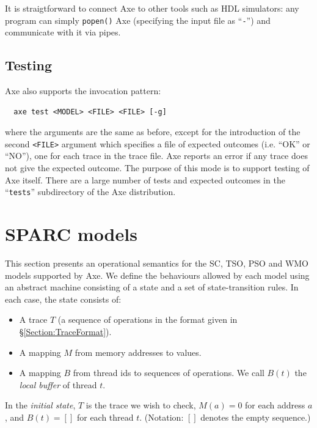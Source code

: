 \documentclass[11pt]{article}
\begin{document}
It is straigtforward to connect Axe to other tools such as HDL
simulators: any program can simply \verb!popen()! Axe (specifying the
input file as ``\verb!-!'') and communicate with it via pipes.

\subsection*{Testing}

Axe also supports the invocation pattern:
\begin{verbatim}
  axe test <MODEL> <FILE> <FILE> [-g]
\end{verbatim}
\noindent where the arguments are the same as before, except for the
introduction of the
second \verb!<FILE>! argument which specifies a file of expected
outcomes (i.e. ``OK'' or ``NO''), one for each trace in the trace
file.  Axe reports an error if any trace does not give
the expected outcome.  The purpose of this mode is to support testing of
Axe itself.  There are a large number of tests and expected outcomes
in the ``\verb!tests!'' subdirectory of the Axe distribution.

\section{SPARC models}
\label{Section:SPARCModels}

This section presents an operational semantics for the SC, TSO, PSO
and WMO models supported by Axe.  We define the behaviours allowed by
each model using an abstract machine consisting of a state and a set
of state-transition rules.  In each case, the state consists of:

\begin{itemize}

\item A trace $T$ (a sequence of operations in the format given in
\S\ref{Section:TraceFormat}).

\item A mapping $M$ from memory addresses to values.

\item A mapping $B$ from thread ids to sequences of operations.  We
call $B(t)$ the \emph{local buffer} of thread $t$.

\end{itemize}

In the \emph{initial state}, $T$ is the trace we wish to check, $M(a)
= 0$ for each address $a$, and $B(t) = []$ for each thread $t$.
(Notation: $[]$ denotes the empty sequence.)
\end{document}

